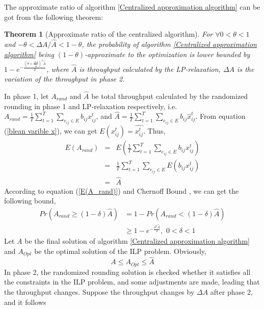 \documentclass[conference]{IEEEtran}
\begin{document}
The approximate ratio of algorithm \ref{Centralized approximation
algorithm} can be got from the following theorem:

\newtheorem{theorm}{Theorem}
\begin{theorm}[Approximate ratio of the centralized algorithm]\label{theorem 1}
For $\forall 0< \theta <1$ and $-\theta<\Delta A/\hat{A}<1-\theta$,
the probability of algorithm \ref{Centralized approximation
algorithm} being $(1-\theta)$-approximate to the optimization is
lower bounded by $1-e^{-\frac{(\theta + \frac{\Delta
A}{\hat{A}})^2\hat{A}}{2}}$, where $\hat{A}$ is throughput
calculated by the LP-relaxation, $\Delta A$ is the variation of the
throughput in phase 2.
\end{theorm}
\begin{IEEEproof}
In phase 1, let $A_{rand}$ and $\hat{A}$ be total throughput
calculated by the randomized rounding in phase 1 and LP-relaxation
respectively, i.e.
$A_{rand}=\frac{1}{T}\sum_{t=1}^{T}\sum_{e_{ij}\in E}
b_{ij}x_{ij}^t$, and
$\hat{A}=\frac{1}{T}\sum_{t=1}^{T}\sum_{e_{ij}\in E}
b_{ij}\hat{x}_{ij}^t$. From equation (\ref{blean varible x}), we can
get $E(x_{ij}^t)=\hat{x_{ij}^t}$. Thus,
\begin{eqnarray}
E(A_{rand})&=&E(\frac{1}{T}\sum_{t=1}^{T}\sum_{e_{ij}\in E} b_{ij}x_{ij}^t)\nonumber\\
           &=&\frac{1}{T}\sum_{t=1}^{T}\sum_{e_{ij}\in E}E(b_{ij}x_{ij}^t) \nonumber\\
           &=&\hat{A}\label{E(A_rand)}
\end{eqnarray}
According to equation (\ref{E(A_rand)}) and Chernoff Bound
\cite{raghavan1987rrt}, we can get the following bound,
\begin{eqnarray}
Pr(A_{rand}\geq(1-\delta)\hat{A}) &=1-Pr(A_{rand}<(1-\delta)\hat{A}) \nonumber\\
                                  &\geq 1-e^{-\frac{\delta^2\hat{A}}{2}},\,\,
                                  0<\delta<1 \label{chernoff bound}
\end{eqnarray}
Let $A$ be the final solution of algorithm \ref{Centralized
approximation algorithm} and $A_{Opt}$  be the optimal solution of
the ILP problem. Obviously,
\begin{equation}\label{A_OPT}
A\leq A_{Opt} \leq \hat{A}
\end{equation}
In phase 2, the randomized rounding solution is checked whether it
satisfies all the constraints in the ILP problem, and some
adjustments are made, leading that the throughput changes. Suppose
the throughput changes by $\Delta A$ after phase 2, and it follows

\end{IEEEproof}
\end{document}
